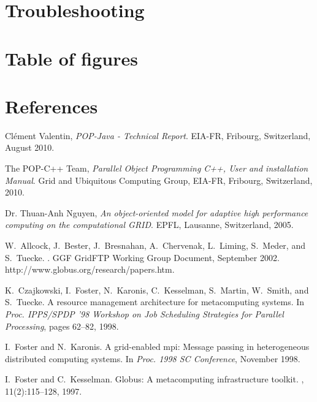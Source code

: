 \documentclass[a4paper, 11pt]{article}
\newcommand{\emptypage}{\newpage \thispagestyle{empty} \mbox{}\newpage}
\begin{document}
\pagebreak
\section{Troubleshooting}


\pagebreak
\section{Table of figures}
\listoffigures{}


\pagebreak
\section{References}
\begin{thebibliography}{9}

	Clément Valentin,
  	\emph{POP-Java - Technical Report}.
	EIA-FR, Fribourg, Switzerland,
	August 2010.

	The POP-C++ Team,
  	\emph{Parallel Object Programming C++, User and installation Manual}.
	Grid and Ubiquitous Computing Group, EIA-FR, Fribourg, Switzerland,
	2010.

	Dr. Thuan-Anh Nguyen,
  	\emph{An object-oriented model for adaptive high performance computing on the computational GRID}.
	EPFL, Lausanne, Switzerland,
	2005.

W.~Allcock, J.~Bester, J.~Bresnahan, A.~Chervenak, L.~Liming, S.~Meder, and
  S.~Tuecke.
.
\newblock GGF GridFTP Working Group Document, September 2002.
\newblock http://www.globus.org/research/papers.htm.

K.~Czajkowski, I.~Foster, N.~Karonis, C.~Kesselman, S.~Martin, W.~Smith, and
  S.~Tuecke.
\newblock A resource management architecture for metacomputing systems.
\newblock In {\em Proc. IPPS/SPDP '98 Workshop on Job Scheduling Strategies for
  Parallel Processing}, pages 62--82, 1998.

I.~Foster and N.~Karonis.
\newblock A grid-enabled mpi: Message passing in heterogeneous distributed
  computing systems.
\newblock In {\em Proc. 1998 SC Conference}, November 1998.

I.~Foster and C.~Kesselman.
\newblock Globus: A metacomputing infrastructure toolkit.
, 11(2):115--128, 1997.


\end{thebibliography}
\end{document}
